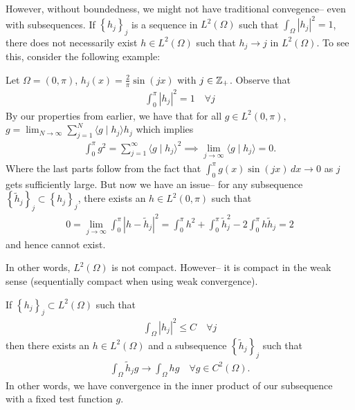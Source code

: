 \documentclass{memoir}
\begin{document}
	However, without boundedness, we might not have traditional convegence-- even with subsequences. If \(\left\{ h_j \right\}_j\) is a sequence in \(L^2(\Omega )\) such that \(\int_\Omega \left| h_j \right|^2 = 1\), there does not necessarily exist \(h \in L^2(\Omega )\) such that \(h_j \to j\) in \(L^2(\Omega )\). To see this, consider the following example:
\begin{exmp}
	Let \(\Omega = (0,\pi )\), \(h_j(x) = \frac{2}{\pi } \sin(jx)\) with \(j \in \mathbb{Z}_+\). Observe that
	\begin{align*}
		\int_{0}^{\pi } \left| h_j \right|^2 = 1 \quad \forall j 
	\end{align*}
	By our properties from earlier, we have that for all \(g \in L^2(0,\pi )\), \(g = \lim_{N \to \infty} \sum_{j=1}^{N} \langle g \mid h_j \rangle h_j\) which implies
	\begin{align*}
		\int_{0}^{\pi } g^2 = \sum_{j=1}^{\infty} \langle g\mid h_j \rangle^2 \implies \lim_{j \to \infty} \langle g \mid h_j \rangle = 0. 
	\end{align*}
	Where the last parts follow from the fact that \(\int_{0}^{\pi } g(x)\sin(jx) \,d x \to 0 \) as \(j\) gets sufficiently large. But now we have an issue-- for any subsequence \(\left\{ \tilde{h}_j \right\}_j \subset \left\{ h_j \right\}_j\), there exists an \(h \in L^2(0,\pi )\) such that
	\begin{align*}
		0 = \lim_{j \to \infty} \int_{0}^{\pi } \left| h- \tilde{h}_j \right|^2 = \int_{0}^{\pi } h^2 + \int_{0}^{\pi } \tilde{h}_j ^2 - 2 \int_{0}^{\pi } h \tilde{h}_j = 2    
	\end{align*}
	and hence cannot exist.
\end{exmp}
In other words, \(L^2(\Omega )\) is not compact. However-- it is compact in the weak sense (sequentially compact when using weak convergence).

\begin{prop}
	If \(\left\{ h_j \right\}_j \subset L^2(\Omega )\) such that
	\begin{align*}
		\int_\Omega \left| h_j \right|^2 \leq C \quad \forall j
	\end{align*}
	then there exists an \(h \in L^2(\Omega )\) and a subsequence \(\left\{ \tilde{h}_j \right\}_j\) such that
	\begin{align*}
		\int_\Omega \tilde{h}_j g \to \int_\Omega h g \quad \forall g \in C^2(\Omega ).
	\end{align*}
	In other words, we have convergence in the inner product of our subsequence with a fixed test function \(g\).
\end{prop}
\end{document}
